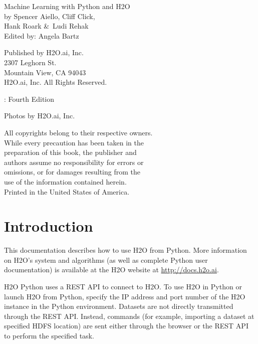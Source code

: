 \newpage
\restoregeometry

\null\vfill %

\thispagestyle{empty}%

{\raggedright 

Machine Learning with Python and H2O\\
  by Spencer Aiello, Cliff Click, \\ Hank Roark \&\  Ludi Rehak\\
Edited by: Angela Bartz
\bigskip

Published by H2O.ai, Inc. \\
2307 Leghorn St. \\
Mountain View, CA 94043\\
\bigskip
\textcopyright \the\year \hspace{1pt} H2O.ai, Inc. All Rights Reserved. 
\bigskip

\monthname \hspace{1pt}  \the\year: Fourth Edition
\bigskip

Photos by \textcopyright H2O.ai, Inc.
\bigskip

All copyrights belong to their respective owners.\\
While every precaution has been taken in the\\
preparation of this book, the publisher and\\
authors assume no responsibility for errors or\\
omissions, or for damages resulting from the\\
use of the information contained herein.\\
\bigskip
Printed in the United States of America. 
}


\newpage
\thispagestyle{empty}%

\tableofcontents
\thispagestyle{empty}%

\newpage

\section{Introduction}

This documentation describes how to use H2O from Python. More information on H2O's system and algorithms
(as well as complete Python user documentation) is available at the H2O website at {\url{http://docs.h2o.ai}}.

H2O Python uses a REST API to connect to H2O. To use H2O in Python or launch H2O from Python, specify the IP address and port number of the H2O instance in the Python environment. Datasets are not directly transmitted
through the REST API. Instead, commands (for example, importing a dataset at specified HDFS location) are sent either through the browser or the REST API to perform the specified task.

